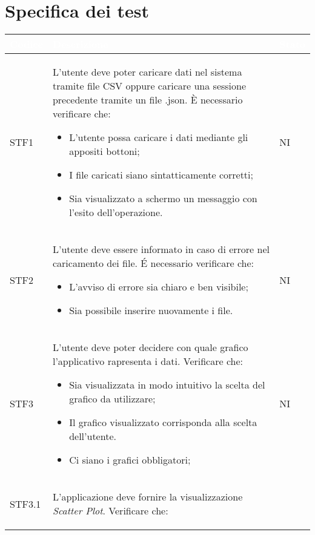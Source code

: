 \section{Specifica dei test}
\begin{center}
    \renewcommand\arraystretch{1.5}
    \centering
    \begin{longtable}{|p{1.5cm}|p{11cm}|p{1cm}|}
    \hline
    \rowcolor[HTML]{036400}
    \textcolor{white}{\textbf{Codice}} & \textcolor{white}{\textbf{Descrizione}} & \textcolor{white}{\textbf{Stato}} \\ \hline
        \rowcolor[HTML]{EFEFEF}
        STF1 & L'utente deve poter caricare dati nel sistema tramite file CSV oppure caricare una sessione precedente tramite un file .json. \`E necessario verificare che: \begin{itemize}
            \item L'utente possa caricare i dati mediante gli appositi bottoni;
            \item I file caricati siano sintatticamente corretti;
            \item Sia visualizzato a schermo un messaggio con l'esito dell'operazione.
        \end{itemize} & NI\\ \hline
        \rowcolor[HTML]{C0C0C0}
        STF2 & L'utente deve essere informato in caso di errore nel caricamento dei file. \'E necessario verificare che: \begin{itemize}
            \item L'avviso di errore sia chiaro e ben visibile;
            \item Sia possibile inserire nuovamente i file.
        \end{itemize} & NI\\ \hline
        \rowcolor[HTML]{EFEFEF}
        STF3 & L'utente deve poter decidere con quale grafico l'applicativo rapresenta i dati. Verificare che: \begin{itemize}
            \item Sia visualizzata in modo intuitivo la scelta del grafico da utilizzare;
            \item Il grafico visualizzato corrisponda alla scelta dell'utente.
            \item Ci siano i grafici obbligatori;
        \end{itemize} & NI\\ \hline
        \rowcolor[HTML]{C0C0C0}
        STF3.1 & L'applicazione deve fornire la visualizzazione  \textit{Scatter Plot}. Verificare che: \begin{itemize}

\end{itemize}
\end{longtable}
\end{center}
